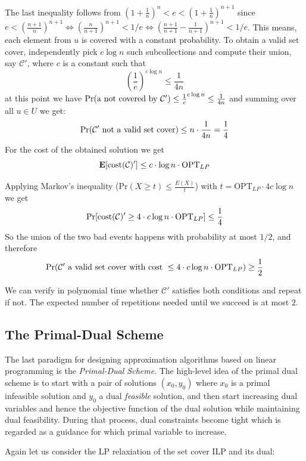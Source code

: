 \documentclass{article}
\begin{document}
The last inequality follows from $(1+\frac{1}{n})^n < e < (1+\frac{1}{n})^{n+1}$ since
$e<(\frac{n+1}{n})^{n+1} \Leftrightarrow (\frac{n}{n+1})^{n+1} < 1/e \Leftrightarrow (\frac{n+1}{n+1}-\frac{1}{n+1})^{n+1}<1/e$.
This means, each element from $u$ is covered with a constant probability.
To obtain a valid set cover, independently pick $c \log n$ such subcollections and compute their union, say $\mathcal{C}'$, where $c$
is a constant such that
\[
	(\frac{1}{e})^{c\log n }\leq \frac{1}{4n}
\]
at this point we have ${\bf \mathrm{Pr}}(\mathrm{a~not~covered~by~}\mathcal{C}') \leq \frac{1}{e}^{c\log n} \leq \frac{1}{4n}$
and summing over all $u\in U$ we get:
\[
	{\bf \mathrm{Pr}}(\mathcal{C}'\mathrm{~not~a~valid~set~cover}) \leq n\cdot \frac{1}{4n}=\frac{1}{4}
\]
For the cost of the obtained solution we get 
\[
	{\bf E}[\mathrm{cost}(\mathcal{C})']\leq c\cdot \log n\cdot \mathrm{OPT}_{LP}
\]

Applying Markov's inequality ($\mathrm{Pr}(X\geq t)\leq \frac{E(X)}{t}$)
with $t=\mathrm{OPT}_{LP}\cdot 4c \log n$ we get
\[
	{\bf \mathrm{Pr}}[\mathrm{cost}(\mathcal{C})'\geq 4\cdot c \log n \cdot \mathrm{OPT}_{LP}]\leq \frac{1}{4} 
\]
So the union of the two bad events happens with probability at most $1/2$, and therefore 
\[
	{\bf \mathrm{Pr}}(\mathcal{C}'\mathrm{~a~valid~set~cover~with~cost~}\leq 4\cdot c \log n \cdot \mathrm{OPT}_{LP}) 
		\geq \frac{1}{2}
\]

We can verify in polynomial time whether $\mathcal{C}'$ satisfies both conditions and repeat if not. The expected number of
repetitions needed until we succeed is at most $2$.


\subsection{The Primal-Dual Scheme}
The last paradigm for designing approximation algorithms based on linear programming is the \emph{Primal-Dual Scheme}. The high-level idea of the primal dual scheme is to start with a pair of solutions $(x_0, y_0)$ where $x_0$ is a primal infeasible solution and $y_0$ a dual \emph{feasible} solution, and then start increasing dual variables and hence the objective function of the dual solution while maintaining dual feasibility. During that process, dual constraints become tight which is regarded as a guidance for which primal variable to increase.

Again let us consider the LP relaxiation of the set cover ILP and its dual:
\end{document}
